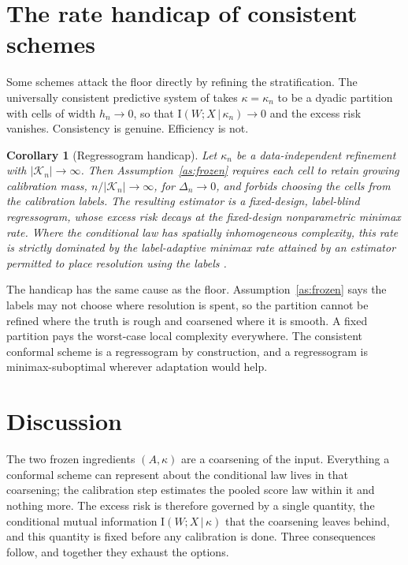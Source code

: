 \documentclass[11pt]{article}
\newtheorem{corollary}[theorem]{Corollary}
\theoremstyle{definition}
\theoremstyle{remark}
\newcommand{\I}{\mathrm{I}}
\newcommand{\cK}{\mathcal{K}}
\newcommand{\given}{\,|\,}
\begin{document}
\section{The rate handicap of consistent schemes}

Some schemes attack the floor directly by refining the stratification. The universally
consistent predictive system of \citet{vovk2022universal} takes $\kappa = \kappa_n$ to
be a dyadic partition with cells of width $h_n \to 0$, so that $\I(W;X\given\kappa_n) \to
0$ and the excess risk vanishes. Consistency is genuine. Efficiency is not.

\begin{corollary}[Regressogram handicap]\label{cor:rate}
Let $\kappa_n$ be a data-independent refinement with $|\cK_n| \to \infty$. Then
Assumption~\ref{as:frozen} requires each cell to retain growing calibration mass,
$n/|\cK_n| \to \infty$, for $\Delta_n \to 0$, and forbids choosing the cells from the
calibration labels. The resulting estimator is a fixed-design, label-blind
regressogram, whose excess risk decays at the fixed-design nonparametric minimax rate.
Where the conditional law has spatially inhomogeneous complexity, this rate is strictly
dominated by the label-adaptive minimax rate attained by an estimator permitted to place
resolution using the labels \citep{stone1982optimal,donoho1998minimax}.
\end{corollary}

The handicap has the same cause as the floor. Assumption~\ref{as:frozen} says the
labels may not choose where resolution is spent, so the partition cannot be refined
where the truth is rough and coarsened where it is smooth. A fixed partition pays the
worst-case local complexity everywhere. The consistent conformal scheme is a
regressogram by construction, and a regressogram is minimax-suboptimal wherever
adaptation would help.

\section{Discussion}

The two frozen ingredients $(A,\kappa)$ are a coarsening of the input. Everything a
conformal scheme can represent about the conditional law lives in that coarsening; the
calibration step estimates the pooled score law within it and nothing more. The excess
risk is therefore governed by a single quantity, the conditional mutual information
$\I(W;X\given\kappa)$ that the coarsening leaves behind, and this quantity is fixed
before any calibration is done. Three consequences follow, and together they exhaust the
options.
\end{document}
